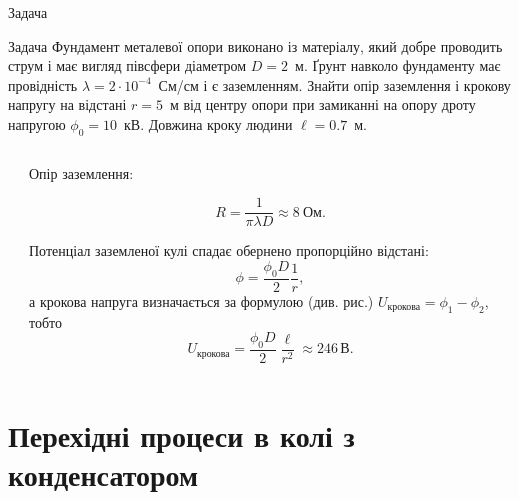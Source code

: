 \documentclass[onlytextwidth]{beamer}
\begin{document}
\begin{frame}{Задача}
	\begin{exampleblock}{Задача}\justifying\small
		Фундамент металевої опори виконано із матеріалу, який добре проводить струм і має вигляд півсфери діаметром $D = 2$~м. Ґрунт
		навколо фундаменту має провідність $\lambda = 2\cdot 10^{-4}$~См/см і є заземленням. Знайти опір заземлення і крокову напругу на відстані $r = 5$~м
		від центру опори при замиканні на опору дроту напругою $\phi_0 = 10$~кВ. Довжина кроку людини $\ell = 0.7$~м.
	\end{exampleblock}
	\begin{columns}
		\begin{column}{0.6\linewidth}
			\begin{center}
				
			\end{center}
		\end{column}
		\begin{column}{0.4\linewidth}
			\begin{block}{}\justifying\small
				Опір заземлення:

                \[
                    R = \frac{1}{\pi\lambda D} \approx 8\ \text{Ом}.
                \]

				Потенціал заземленої кулі спадає обернено пропорційно відстані:
				\[
					\phi = \frac{\phi_0 D}{2}\frac{1}{r},
				\]
				а крокова напруга визначається за формулою (див. рис.) $U_\text{крокова} = \phi_1 - \phi_2$, тобто
				\[
					U_\text{крокова} = \frac{\phi_0D}{2}\frac{\ell}{r^2} \approx 246\, \text{В}.
				\]
			\end{block}
		\end{column}
	\end{columns}
\end{frame}


\section{Перехідні процеси в колі з конденсатором}
\end{document}
